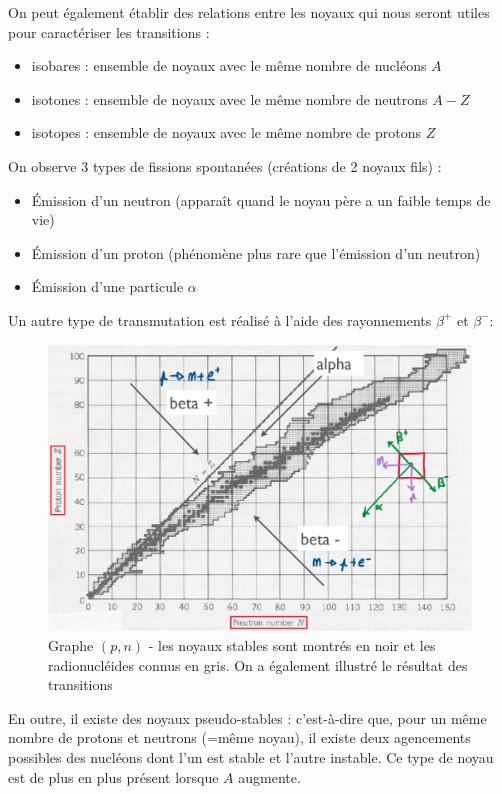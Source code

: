 On peut également établir des relations entre les noyaux qui nous seront utiles pour caractériser les transitions :
\begin{itemize}
    \item isobares : ensemble de noyaux avec le même nombre de nucléons $A$
    \item isotones : ensemble de noyaux avec le même nombre de neutrons $A-Z$
    \item isotopes : ensemble de noyaux avec le même nombre de protons $Z$ 
\end{itemize}
On observe 3 types de fissions spontanées (créations de 2 noyaux fils) :
\begin{itemize}
    \item Émission d'un neutron (apparaît quand le noyau père a un faible temps de vie)
    \item Émission d'un proton (phénomène plus rare que l'émission d'un neutron)
    \item Émission d'une particule $\alpha$
\end{itemize}
Un autre type de transmutation est réalisé à l'aide des rayonnements $\beta^+$ et $\beta^-$:
\begin{figure}[H]
    \centering
    \includegraphics[scale=0.3]{Images4/Stabilite_noyaux_2.png}
    \caption{Graphe $(p,n)$ - les noyaux stables sont montrés en noir et les radionucléides connus en gris. On a également illustré le résultat des transitions}
    \label{fig:Stabilité noyaux 1}
\end{figure}
En outre, il existe des noyaux pseudo-stables : c'est-à-dire que, pour un même nombre de protons et neutrons (=même noyau), il existe deux agencements possibles des nucléons dont l'un est stable et l'autre instable. Ce type de noyau est de plus en plus présent lorsque $A$ augmente.

